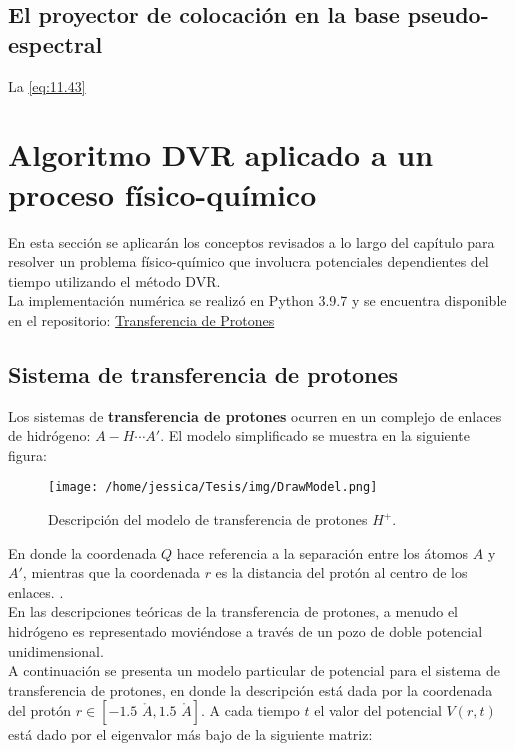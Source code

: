 \subsection{El proyector de colocación en la base pseudo-espectral}
La \autoref{eq:11.43} 

\section{Algoritmo DVR aplicado a un proceso físico-químico}\label{sec:DVRapp}

En esta sección se aplicarán los conceptos revisados a lo largo del capítulo para resolver un problema físico-químico que involucra potenciales dependientes del tiempo utilizando el método \acs{DVR}.\\
La implementación numérica se realizó en Python 3.9.7 y se encuentra disponible en el repositorio: \href{https://github.com/Jessi-MM/PropagatorLearning/blob/main/src/ANN_as_Propagators_DidacticNotebook.ipynb}{\faGithub Transferencia de Protones}

\subsection{Sistema de transferencia de protones}\label{sec:ProtonTransfer}

Los sistemas de \textbf{transferencia de protones} ocurren en un complejo de enlaces de hidrógeno: $A-H\dotsb A'$. El modelo simplificado se muestra en la siguiente figura:

\begin{figure}[ht]
  \centering
\texttt{[image: /home/jessica/Tesis/img/DrawModel.png]}
\caption{Descripción del modelo de transferencia de protones $H^+$.}
\label{fig:drawmodel}
\end{figure}

En donde la coordenada $Q$ hace referencia a la separación entre los átomos $A$ y $A'$, mientras que la coordenada $r$ es la distancia del protón al centro de los enlaces. \cite{DynamicalTheoryPTS}. \\
En las descripciones teóricas de la transferencia de protones, a menudo el hidrógeno es representado moviéndose a través de un pozo de doble potencial unidimensional. \cite{Enzymes}
\\

A continuación se presenta un modelo particular de potencial para el sistema de transferencia de protones, en donde la descripción está dada por la coordenada del protón $r \in [-1.5 \,\,\mathring{A}, 1.5 \,\,\mathring{A}]$. A cada tiempo $t$ el valor del potencial $V(r,t)$ está dado por el eigenvalor más bajo de la siguiente matriz:

